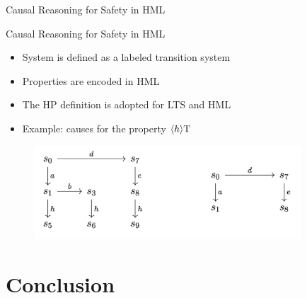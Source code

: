 \begin{frame}{Causal Reasoning for Safety in HML}
    \begin{figure}
        \centering
    \end{figure}
\end{frame}

\begin{frame}{Causal Reasoning for Safety in HML}
    \begin{itemize}
        \item System is defined as a labeled transition system
        \item Properties are encoded in HML
        \item The HP definition is adopted for LTS and HML
        \item Example: causes for the property 
        $\langle h \rangle\mathrm{T}$
    \end{itemize} 
    \begin{figure}
        \centering
        \includegraphics[width=10cm]{resources/hml-cause-example.png}
    \end{figure}
\end{frame}

\section{Conclusion}

